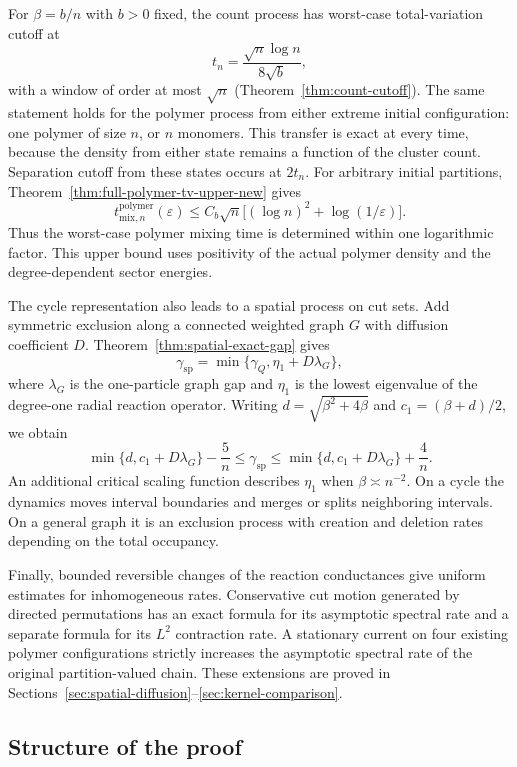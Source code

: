 For $\beta=b/n$ with $b>0$ fixed, the count process has worst-case
total-variation cutoff at
\[
 t_n=\frac{\sqrt n\log n}{8\sqrt b},
\]
with a window of order at most $\sqrt n$
(Theorem~\ref{thm:count-cutoff}). The same statement holds for the
polymer process from either extreme initial configuration: one polymer
of size $n$, or $n$ monomers. This transfer is exact at every time,
because the density from either state remains a function of the
cluster count. Separation cutoff from these states occurs at $2t_n$.
For arbitrary initial partitions,
Theorem~\ref{thm:full-polymer-tv-upper-new} gives
\[
 t^{\mathrm{polymer}}_{\mathrm{mix},n}(\varepsilon)
 \le C_b\sqrt n\bigl[(\log n)^2+\log(1/\varepsilon)\bigr].
\]
Thus the worst-case polymer mixing time is determined within one
logarithmic factor. This upper bound uses positivity of the actual
polymer density and the degree-dependent sector energies.

The cycle representation also leads to a spatial process on cut sets.
Add symmetric exclusion along a connected weighted graph $G$ with
diffusion coefficient $D$. Theorem~\ref{thm:spatial-exact-gap} gives
\[
 \gamma_{\mathrm{sp}}
   =\min\{\gamma_Q,\eta_1+D\lambda_G\},
\]
where $\lambda_G$ is the one-particle graph gap and $\eta_1$ is the
lowest eigenvalue of the degree-one radial reaction operator.
Writing $d=\sqrt{\beta^2+4\beta}$ and $c_1=(\beta+d)/2$, we obtain
\[
 \min\{d,c_1+D\lambda_G\}-\frac5n
 \le\gamma_{\mathrm{sp}}\le
 \min\{d,c_1+D\lambda_G\}+\frac4n.
\]
An additional critical scaling function describes $\eta_1$ when
$\beta\asymp n^{-2}$. On a cycle the dynamics moves interval
boundaries and merges or splits neighboring intervals. On a general
graph it is an exclusion process with creation and deletion rates
depending on the total occupancy.

Finally, bounded reversible changes of the reaction conductances
give uniform estimates for inhomogeneous rates. Conservative cut
motion generated by directed permutations has an exact formula for
its asymptotic spectral rate and a separate formula for its
$L^2$ contraction rate. A stationary current on four existing
polymer configurations strictly increases the asymptotic spectral
rate of the original partition-valued chain. These extensions are
proved in Sections~\ref{sec:spatial-diffusion}--\ref{sec:kernel-comparison}.



\subsection{Structure of the proof}

